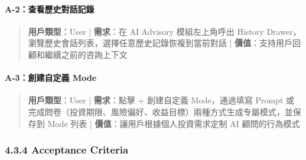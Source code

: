 
\paragraph{A-2：查看歷史對話記錄}

\begin{quote}\small \textbf{用戶類型}：User | \textbf{需求}：在 AI Advisory 模組左上角呼出 History Drawer，瀏覽歷史會話列表，選擇任意歷史記錄恢複到當前對話 | \textbf{價值}：支持用戶回顧和繼續之前的咨詢上下文\end{quote}


\paragraph{A-3：創建自定義 Mode}

\begin{quote}\small \textbf{用戶類型}：User | \textbf{需求}：點擊 + 創建自定義 Mode，通過填寫 Prompt 或完成問卷（投資期限、風險偏好、收益目標）兩種方式生成专屬模式，並保存到 Mode 列表 | \textbf{價值}：讓用戶根據個人投資需求定制 AI 顧問的行為模式\end{quote}


\subsubsection{4.3.4 Acceptance Criteria}


